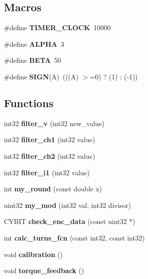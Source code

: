 \subsection*{Macros}
\begin{DoxyCompactItemize}
\item 
\mbox{\label{utils_8h_a05ec5d63e2ba7621d706137124efca7d}} 
\#define {\bfseries T\+I\+M\+E\+R\+\_\+\+C\+L\+O\+CK}~10000
\item 
\mbox{\label{utils_8h_af5abd28c44c29b7397c84f1fec4b1d84}} 
\#define {\bfseries A\+L\+P\+HA}~3
\item 
\mbox{\label{utils_8h_a1b996515309fc3c03449912bb33046e3}} 
\#define {\bfseries B\+E\+TA}~50
\item 
\mbox{\label{utils_8h_a8c7db0cde6d591a5abad279ba92ef021}} 
\#define {\bfseries S\+I\+GN}(A)~(((A) $>$=0) ? (1) \+: (-\/1))
\end{DoxyCompactItemize}
\subsection*{Functions}
\begin{DoxyCompactItemize}
\item 
\mbox{\label{utils_8h_af034fe9aa479d4adfc6e75e20b2f7ff3}} 
int32 {\bfseries filter\+\_\+v} (int32 new\+\_\+value)
\item 
\mbox{\label{utils_8h_ae143e439a41178d1cf10da4920488f86}} 
int32 {\bfseries filter\+\_\+ch1} (int32 value)
\item 
\mbox{\label{utils_8h_a45f7702bcbea56e0d255f6a615e6b8ae}} 
int32 {\bfseries filter\+\_\+ch2} (int32 value)
\item 
\mbox{\label{utils_8h_a3588bc1aa14c6ea245387dda7eb7ffbe}} 
int32 {\bfseries filter\+\_\+i1} (int32 value)
\item 
\mbox{\label{utils_8h_a1ea4108a2c530470624ce2678e65dcef}} 
int {\bfseries my\+\_\+round} (const double x)
\item 
\mbox{\label{utils_8h_a01d3bb6c1fd469a6c530fb296e4fe0fe}} 
uint32 {\bfseries my\+\_\+mod} (int32 val, int32 divisor)
\item 
\mbox{\label{utils_8h_a8f6aff189d5fbbb0be1fdd13e0e720c0}} 
C\+Y\+B\+IT {\bfseries check\+\_\+enc\+\_\+data} (const uint32 $\ast$)
\item 
\mbox{\label{utils_8h_ae960bf45f856281916be3903b7086a20}} 
int {\bfseries calc\+\_\+turns\+\_\+fcn} (const int32, const int32)
\item 
\mbox{\label{utils_8h_a6d9dc88d64cd1f74a30fd0e404a3bb31}} 
void {\bfseries calibration} ()
\item 
\mbox{\label{utils_8h_a2fa6633b5385b65f8c63e730891d9781}} 
void {\bfseries torque\+\_\+feedback} ()
\end{DoxyCompactItemize}


